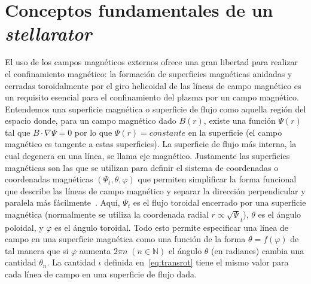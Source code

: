 \section{Conceptos fundamentales de un \textit{stellarator}}
El uso de los campos magnéticos externos ofrece una gran libertad para
realizar el confinamiento magnético: la formación de superficies magnéticas
anidadas y cerradas toroidalmente por el giro helicoidal de las líneas de campo
magnético es un requisito esencial para el confinamiento del plasma por un
campo magnético. Entendemos una superficie magnética o superficie de flujo
como aquella región del espacio donde, para un campo magnético dado $B(r)$,
existe una función $\Psi(r)$ tal que $B\cdot\nabla\Psi=0$ por lo que $\Psi(r)=constante$ en la
superficie (el campo magnético es tangente a estas superficies). La superficie de flujo más interna, la cual degenera
en una línea, se llama eje magnético. Justamente las superficies magnéticas
son las que se utilizan para definir el sistema de coordenadas o coordenadas
magnéticas $(\Psi_t,\theta,\varphi)$ que permiten simplificar la forma funcional que describe
las líneas de campo magnético y separar la dirección perpendicular y paralela
más fácilmente~\cite{doi:10.1063/1.872833}. Aquí, $\Psi_t$ es el flujo toroidal encerrado por una superficie
magnética (normalmente se utiliza la coordenada radial $r\propto\sqrt\Psi_t$), $\theta$ es el
ángulo poloidal, y $\varphi$ es el ángulo toroidal. Todo esto permite especificar una
línea de campo en una superficie magnética como una función de la forma 
$\theta=f(\varphi)$ de tal manera que si $\varphi$ aumenta $2\pi n\;(n\in\mathbb{N})$ el ángulo $\theta$ (en radianes)
cambia una cantidad $\theta_n$. La cantidad $\iota$ definida en~\ref{eq:transrot} tiene el mismo valor para cada línea de
campo en una superficie de flujo dada.
